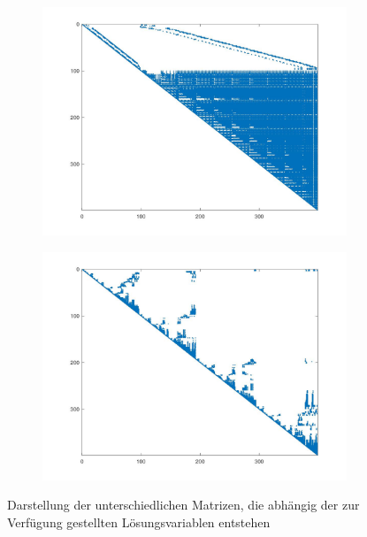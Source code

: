 \begin{figure}[h!]
\begin{subfigure}[h]{.48\textwidth}
		\includegraphics[width=\textwidth]{data/ULU}
		\label{fig:ULU}
	\end{subfigure}
	\begin{subfigure}[h]{.48\textwidth}
		\centering
		\includegraphics[width=\textwidth,]{data/ULUPQ}
		\label{fig:ULUPQ}
	\end{subfigure}%
\caption{Darstellung der unterschiedlichen Matrizen, die abhängig der zur Verfügung gestellten Lösungsvariablen entstehen}
\end{figure}

